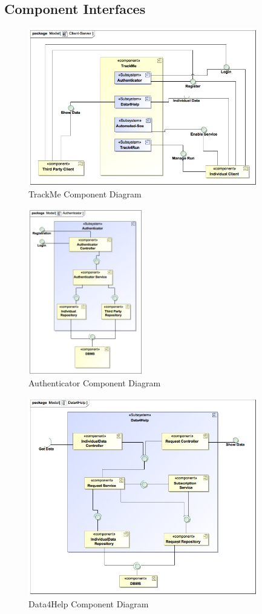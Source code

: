 \documentclass[a4paper]{article}
\begin{document}
\subsection{Component Interfaces}
\begin{figure}[!htpb]
    \centering
    \includegraphics[width=100mm,keepaspectratio]{images/UML/component_TrackMe.jpg}
    \caption{TrackMe Component Diagram}
    \label{fig:component_trackme}
\end{figure}
\begin{figure}[!htpb]
    \centering
    \includegraphics[width=50mm,keepaspectratio]{DD/images/UML/component_Authenticator.jpg}
    \caption{Authenticator Component Diagram}
    \label{fig:component_authenticator}
\end{figure}
\begin{figure}[!htpb]
    \centering
    \includegraphics[width=100mm,keepaspectratio]{DD/images/UML/component_Data4Help.jpg}
    \caption{Data4Help Component Diagram}
    \label{fig:component_data4help}
\end{figure}
\end{document}
